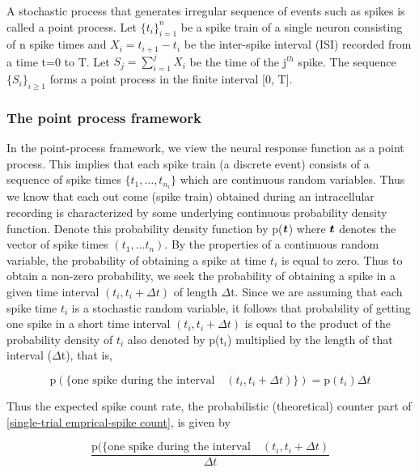 A stochastic process that generates irregular sequence of events such as spikes is called a point process. Let $\{t_{i} \}_{i=1}^{n}$ be a spike train of a single neuron consisting of
n spike times and $X_{i} = t_{i+1} - t_{i}$ be the inter-spike interval (ISI) recorded from
a time t=0 to T. Let $S_{j} = \sum_{i=1}^{j}X_{i}$ be the time of the j$^{th}$ spike.
The sequence $\{ S_{i} \}_{i \geq 1}$ forms a point process in the finite interval [0, T].




\subsubsection{The point process framework}
In the point-process framework, we view the neural response function as a point process. This implies that each spike train (a discrete event) consists of a sequence of spike times $\{t_{1}, \ldots, t_{n_{i}} \}$ which
are continuous random variables. Thus we know that each out come (spike train)
obtained during an intracellular recording is characterized by some underlying continuous probability density function. Denote this probability density function by p($\boldsymbol{t}$) where $\boldsymbol{t}$ denotes the vector of spike times $(t_{1}, \ldots t_{n})$. By the properties of a continuous random variable, the probability of obtaining a spike at time $t_{i}$ is equal to zero. Thus to obtain a non-zero probability, we seek the probability of obtaining a spike in a given time interval $(t_{i}, t_{i}+\Delta t)$ of length $\Delta$t.
Since we are assuming that each spike time $t_{i}$ is a stochastic random variable, it follows that  probability of getting one spike in a short time interval $(t_i, t_i+\Delta t)$ is equal to the product of  the probability density of $t_{i}$ also denoted by p(t$_{i}$) multiplied by the length 
of that interval ($\Delta$t), that is,

\[
\displaystyle \text{p}(\{\text{one spike during the interval} \quad (t_{i}, t_{i}+\Delta t) \}) = \text{p}(t_{i})\Delta t  
\]



Thus the expected spike count rate, the probabilistic (theoretical) counter part
of \eqref{single-trial emprical-spike count}, is given by

\begin{equation}\label{expected count rate}
\displaystyle 
\dfrac{\text{p}(\{\text{one spike during the interval} \quad (t_{i}, t_{i}+\Delta t)}{\Delta t} 
\end{equation}

